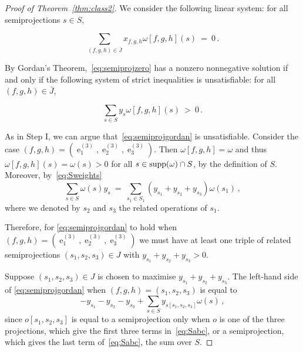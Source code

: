 \documentclass[11pt, reqno]{article}
\DeclareMathOperator{\proj}{\ensuremath{e}}
\newcommand{\tuple}[1]{\ensuremath{(#1)}}
\DeclareMathOperator{\supp}{{\rm supp}}
\theoremstyle{remark}
\begin{document}
\begin{proof}[Proof of Theorem~\ref{thm:class2}]
    
  We consider the following linear system: for all semiprojections $s\in S$,
  
  \begin{equation} \label{eq:semiprojzero} \sum_{\tuple{f,g,h}\in
  \bar{J}}x_{f,g,h}\omega[f,g,h](s)\ =\ 0\,. \end{equation} 

  By Gordan's Theorem,~\eqref{eq:semiprojzero} has a nonzero nonnegative solution
  if and only if the following system of strict
  inequalities is unsatisfiable: for all $(f,g,h) \in \bar{J}$,
  
  \begin{equation} \label{eq:semiprojgordan} 
  \sum_{s \in S}y_s\omega[f,g,h](s)\ >\ 0\,. 
  \end{equation} 

  As in Step I, we can argue that~\eqref{eq:semiprojgordan} is unsatisfiable.
  Consider the case $\tuple{f,g,h}=\tuple{\proj^{(3)}_1,\proj^{(3)}_2,\proj^{(3)}_3}$.
  Then $\omega[f,g,h]=\omega$ and thus $\omega[f,g,h](s)=\omega(s)>0$ for all
  $s\in\supp(\omega)\cap S$,
  by the definition of $S$. Moreover, by~\eqref{eq:Sweights} 
  \begin{equation}\label{eq:Ssplit}
  \sum_{s\in S}\omega(s)y_s \ =\ \sum_{s_1\in
  S_1}(y_{s_1}+y_{s_2}+y_{s_3})\omega(s_1)\,,
  \end{equation} 
  where we denoted by $s_2$ and $s_3$ the related operations of $s_1$.

  Therefore, for \eqref{eq:semiprojgordan} to hold when $\tuple{f,g,h} =
  \tuple{\proj^{(3)}_1,\proj^{(3)}_2,\proj^{(3)}_3}$ we must have at least one
  triple of related semiprojections $\tuple{s_1,s_2,s_3} \in J$
  with $y_{s_1} + y_{s_2} + y_{s_3} > 0$. 
  
  Suppose $\tuple{s_1,s_2,s_3}\in J$ is chosen
  to maximise
  $y_{s_1} + y_{s_2} + y_{s_3}$. 
  The left-hand side of \eqref{eq:semiprojgordan} when
  $\tuple{f,g,h} = \tuple{s_1,s_2,s_3}$ is equal to
  \begin{equation}\label{eq:Sabc}
    - y_{s_1} - y_{s_2} - y_{s_3} + \sum_{s \in S}y_{s[s_1,s_2,s_3]}\omega(s)\,,
  \end{equation}
  since $o[s_1,s_2,s_3]$ is equal to a semiprojection only when $o$ is one
  of the three projections, which give the first three terms in~\eqref{eq:Sabc},
  or a semiprojection, which gives the last term of~\eqref{eq:Sabc}, the sum over $S$.


\end{proof}
\end{document}
